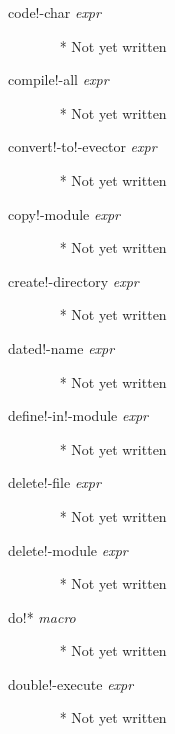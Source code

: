 \documentclass[a4paper,11pt]{article}
\begin{document}
\begin{description}
\item [{\ttfamily code!-char} {\itshape  expr}]  ~\newline
  * Not yet written

\item [{\ttfamily compile!-all} {\itshape  expr}]  ~\newline
  * Not yet written

\item [{\ttfamily convert!-to!-evector} {\itshape  expr}]  ~\newline
  * Not yet written

\item [{\ttfamily copy!-module} {\itshape  expr}]  ~\newline
  * Not yet written

\item [{\ttfamily create!-directory} {\itshape  expr}]  ~\newline
  * Not yet written

\item [{\ttfamily dated!-name} {\itshape  expr}]  ~\newline
  * Not yet written

\item [{\ttfamily define!-in!-module} {\itshape  expr}]  ~\newline
  * Not yet written

\item [{\ttfamily delete!-file} {\itshape  expr}]  ~\newline
  * Not yet written

\item [{\ttfamily delete!-module} {\itshape  expr}]  ~\newline
  * Not yet written

\item [{\ttfamily do!*} {\itshape macro}]  ~\newline
  * Not yet written

\item [{\ttfamily double!-execute} {\itshape  expr}]  ~\newline
  * Not yet written


\end{description}
\end{document}
